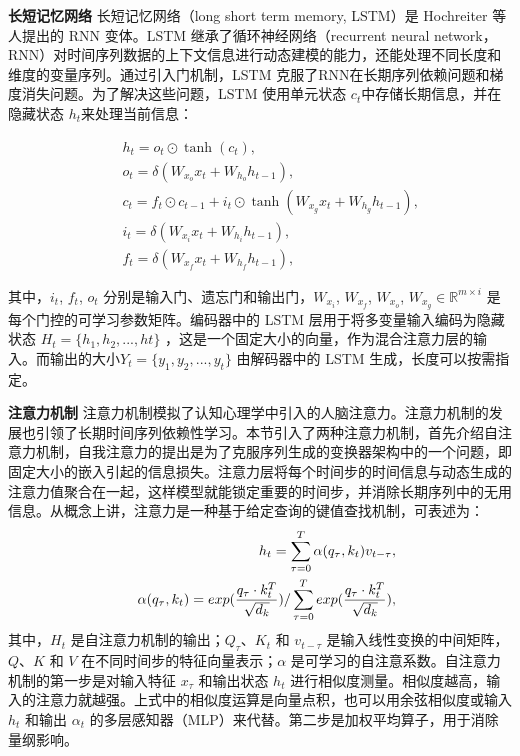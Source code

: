 \textbf{长短记忆网络} 长短记忆网络（long short term memory, LSTM）是 Hochreiter 等人提出的 RNN 变体\cite{SHochreiter1997}。LSTM 继承了循环神经网络（recurrent neural network，RNN）对时间序列数据的上下文信息进行动态建模的能力，还能处理不同长度和维度的变量序列。通过引入门机制，LSTM 克服了RNN在长期序列依赖问题和梯度消失问题。为了解决这些问题，LSTM 使用单元状态 $c_{t} $中存储长期信息，并在隐藏状态 $h_{t}$来处理当前信息：

\begin{eqnarray}
&& h_{t} = o_{t}\odot \tanh(c_{t}),\\
&& o_{t} = \delta(W_{x_{o}}x_{t}+W_{h_{o}}h_{t-1}),\\
&& c_{t} = {f}_{t}\odot {c}_{t-1}+i_{t}\odot \tanh(W_{x_{g}}x_{t}+W_{h_{g}}h_{t-1}),\\
&& i_{t} = \delta(W_{x_{i}}x_{t}+W_{h_{i}}h_{t-1}),\\
&& f_{t} = \delta(W_{x_{f}}x_{t}+W_{h_{f}}h_{t-1}),
\end{eqnarray}

其中，$i_{t}$, $f_{t}$, $o_{t}$ 分别是输入门、遗忘门和输出门，$W_{x_{i}}$, $W_{x_{f}}$, $W_{x_{o}}$, $W_{x_{g}} \in \mathbb{R}^{m\times i}$ 是每个门控的可学习参数矩阵。编码器中的 LSTM 层用于将多变量输入编码为隐藏状态 $H_{t}=\{h_{1}, h_{2}, ... , h{t}\}$ ，这是一个固定大小的向量，作为混合注意力层的输入。而输出的大小$Y_{t}=\{y_{1},y_{2}, ... ,y_{t}\}$ 由解码器中的 LSTM 生成，长度可以按需指定。

\textbf{注意力机制} 注意力机制模拟了认知心理学中引入的人脑注意力。注意力机制的发展也引领了长期时间序列依赖性学习。本节引入了两种注意力机制，首先介绍自注意力机制，自我注意力的提出是为了克服序列生成的变换器架构中的一个问题，即固定大小的嵌入引起的信息损失\cite{AVaswani2017}。注意力层将每个时间步的时间信息与动态生成的注意力值聚合在一起，这样模型就能锁定重要的时间步，并消除长期序列中的无用信息。从概念上讲，注意力是一种基于给定查询的键值查找机制，可表述为：
\begin{eqnarray}
&& h_{t} = \sum^{T}_{\tau = 0} \alpha (q_{\tau},k_{t})v_{t-\tau },\\
&& \alpha (q_{\tau},k_{t}) = exp(\frac{q_{\tau} \cdot k_{t}^{T}}{\sqrt{d_{k}}}) \// \sum^{T}_{\tau = 0} exp(\frac{q_{\tau} \cdot k_{t}^{T}}{\sqrt{d_{k}}}),
\end{eqnarray}
其中，$H_{t}$ 是自注意力机制的输出；$Q_{\tau}$、$K_{t}$ 和 $v_{t-\tau}$ 是输入线性变换的中间矩阵，$Q、K$ 和 $V$ 在不同时间步的特征向量表示；$\alpha$ 是可学习的自注意系数。自注意力机制的第一步是对输入特征 $x_{\tau}$ 和输出状态 $h_{t}$ 进行相似度测量。相似度越高，输入的注意力就越强。上式中的相似度运算是向量点积，也可以用余弦相似度或输入 $h_{t}$ 和输出 $\alpha_{t}$ 的多层感知器（MLP）来代替。第二步是加权平均算子，用于消除量纲影响\cite{AVaswani2017}。

